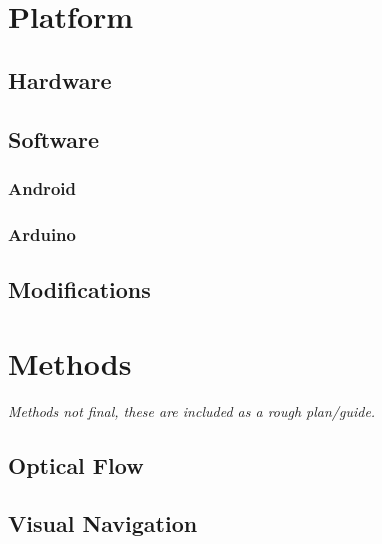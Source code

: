 \documentclass[a4paper,11pt,twoside,openright]{article}
\let\oldsection\section
\def\section{\cleardoublepage\oldsection}
\begin{document}
\newpage

\section{ Platform } \label{sec:platform}
\subsection{ Hardware }
\subsection{ Software }
\subsubsection{ Android } \label{subsubsec:droid}
\subsubsection{ Arduino }
\subsection{ Modifications }
\newpage

\section{ Methods } \label{sec:methods}
\textit{
  Methods not final, these are included as a rough plan/guide.
  }
\subsection{ Optical Flow }
\subsection{ Visual Navigation }
\end{document}

